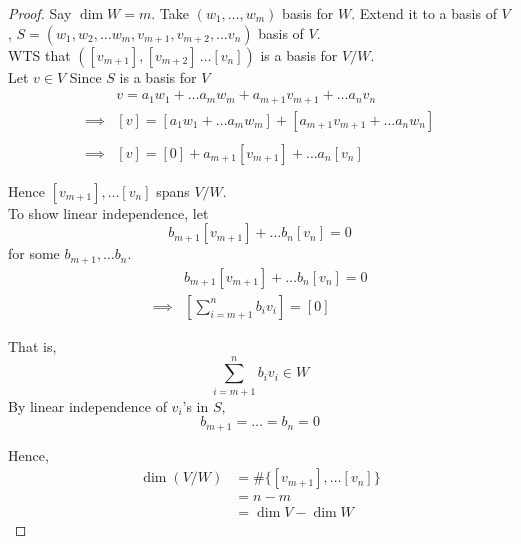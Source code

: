 \begin{proof}
    Say $\dim W = m$. Take $(w_1, \hdots, w_m)$ basis for $W$. Extend it to a basis of $V$, $S = (w_1, w_2, \hdots w_m, v_{m + 1}, v_{m + 2}, \hdots v_n)$ basis of $V$.  \\

    WTS that $([v_{m + 1}], [v_{m + 2}] \, \hdots [v_n])$ is a basis for $V /W$. \\

    Let $v \in V$ Since $S$ is a basis for $V$
    \begin{align*}
        & v = a_1 w_1 + \hdots a_m w_m + a_{m + 1}v_{m + 1} + \hdots a_n v_n \\
        \implies & [v] = [a_1 w_1 + \hdots a_m w_m] + [a_{m + 1} v_{m + 1} + \hdots a_n w_n] \\ \\
        \implies & [v] = [0] + a_{m + 1}[v_{m + 1}] + \hdots a_n [v_n]
    \end{align*}

    Hence $[v_{m + 1}], \hdots [v_n]$ spans $V /W$. \\


    To show linear independence, let 
    \[
        b_{m + 1} [v_{m + 1}] + \hdots b_n [v_n] = 0
    \]
    for some $b_{m + 1}, \hdots b_n$. \\
    \begin{align*}
        & b_{m + 1} [v_{m + 1}] + \hdots b_n [v_n] = 0 \\
        \implies & \left[ \sum\limits_{i = m+1}^{n} b_i v_i\right] = [0]
    \end{align*}

    That is, 
    \[
        \sum\limits_{i = m+1}^{n} b_i v_i \in W
    \]
    By linear independence of $v_i$'s in $S$, 
    \[
        b_{m + 1} = \hdots = b_n = 0
    \]

    Hence, 
    \begin{align*}
        \dim (V /W) &= \# \{ [v_{m + 1}], \hdots [v_n] \}  \\
        &= n - m \\
        &= \dim V - \dim W
    \end{align*}
\end{proof}

